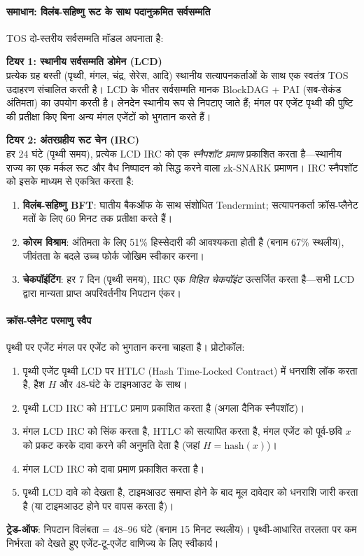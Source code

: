 \documentclass[11pt]{article}
\begin{document}
\begin{itemize}[noitemsep]
\begin{itemize}[noitemsep]
\paragraph{समाधान: विलंब-सहिष्णु रूट के साथ पदानुक्रमित सर्वसम्मति}
TOS दो-स्तरीय सर्वसम्मति मॉडल अपनाता है:

\textbf{टियर 1: स्थानीय सर्वसम्मति डोमेन (LCD)}\\
प्रत्येक ग्रह बस्ती (पृथ्वी, मंगल, चंद्र, सेरेस, आदि) स्थानीय सत्यापनकर्ताओं के साथ एक स्वतंत्र TOS उदाहरण संचालित करती है। LCD के भीतर सर्वसम्मति मानक BlockDAG + PAI (सब-सेकंड अंतिमता) का उपयोग करती है। लेनदेन स्थानीय रूप से निपटाए जाते हैं; मंगल पर एजेंट पृथ्वी की पुष्टि की प्रतीक्षा किए बिना अन्य मंगल एजेंटों को भुगतान करते हैं।

\textbf{टियर 2: अंतरग्रहीय रूट चेन (IRC)}\\
हर 24 घंटे (पृथ्वी समय), प्रत्येक LCD IRC को एक \emph{स्नैपशॉट प्रमाण} प्रकाशित करता है—स्थानीय राज्य का एक मर्कल रूट और वैध निष्पादन को सिद्ध करने वाला zk-SNARK प्रमाणन। IRC स्नैपशॉट को इसके माध्यम से एकत्रित करता है:
\begin{enumerate}[noitemsep]
  \item \textbf{विलंब-सहिष्णु BFT}: घातीय बैकऑफ के साथ संशोधित Tendermint; सत्यापनकर्ता क्रॉस-प्लैनेट मतों के लिए 60 मिनट तक प्रतीक्षा करते हैं।
  \item \textbf{कोरम विश्राम}: अंतिमता के लिए 51\% हिस्सेदारी की आवश्यकता होती है (बनाम 67\% स्थलीय), जीवंतता के बदले उच्च फोर्क जोखिम स्वीकार करना।
  \item \textbf{चेकपॉइंटिंग}: हर 7 दिन (पृथ्वी समय), IRC एक \emph{विहित चेकपॉइंट} उत्सर्जित करता है—सभी LCD द्वारा मान्यता प्राप्त अपरिवर्तनीय निपटान एंकर।
\end{enumerate}

\paragraph{क्रॉस-प्लैनेट परमाणु स्वैप}
पृथ्वी पर एजेंट मंगल पर एजेंट को भुगतान करना चाहता है। प्रोटोकॉल:
\begin{enumerate}[noitemsep]
  \item पृथ्वी एजेंट पृथ्वी LCD पर HTLC (Hash Time-Locked Contract) में धनराशि लॉक करता है, हैश $H$ और 48-घंटे के टाइमआउट के साथ।
  \item पृथ्वी LCD IRC को HTLC प्रमाण प्रकाशित करता है (अगला दैनिक स्नैपशॉट)।
  \item मंगल LCD IRC को सिंक करता है, HTLC को सत्यापित करता है, मंगल एजेंट को पूर्व-छवि $x$ को प्रकट करके दावा करने की अनुमति देता है (जहां $H = \text{hash}(x)$)।
  \item मंगल LCD IRC को दावा प्रमाण प्रकाशित करता है।
  \item पृथ्वी LCD दावे को देखता है, टाइमआउट समाप्त होने के बाद मूल दावेदार को धनराशि जारी करता है (या टाइमआउट होने पर वापस करता है)।
\end{enumerate}
\textbf{ट्रेड-ऑफ}: निपटान विलंबता = 48--96 घंटे (बनाम 15 मिनट स्थलीय)। पृथ्वी-आधारित तरलता पर कम निर्भरता को देखते हुए एजेंट-टू-एजेंट वाणिज्य के लिए स्वीकार्य।


\end{itemize}
\end{itemize}
\end{document}
